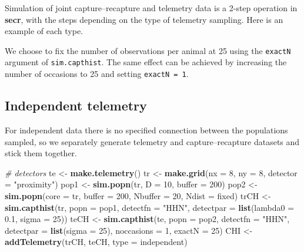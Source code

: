 \documentclass[
]{book}
\newenvironment{Shaded}{\begin{snugshade}}{\end{snugshade}}
\newcommand{\AttributeTok}[1]{\textcolor[rgb]{0.13,0.29,0.53}{#1}}
\newcommand{\CommentTok}[1]{\textcolor[rgb]{0.56,0.35,0.01}{\textit{#1}}}
\newcommand{\DecValTok}[1]{\textcolor[rgb]{0.00,0.00,0.81}{#1}}
\newcommand{\FloatTok}[1]{\textcolor[rgb]{0.00,0.00,0.81}{#1}}
\newcommand{\FunctionTok}[1]{\textcolor[rgb]{0.13,0.29,0.53}{\textbf{#1}}}
\newcommand{\NormalTok}[1]{#1}
\newcommand{\OtherTok}[1]{\textcolor[rgb]{0.56,0.35,0.01}{#1}}
\newcommand{\StringTok}[1]{\textcolor[rgb]{0.31,0.60,0.02}{#1}}
\begin{document}
Simulation of joint capture--recapture and telemetry data is a 2-step operation in \textbf{secr}, with the steps depending on the type of telemetry sampling. Here is an example of each type.

We choose to fix the number of observations per animal at 25 using the \texttt{exactN} argument of \texttt{sim.capthist}. The same effect can be achieved by increasing the number of occasions to 25 and setting \texttt{exactN\ =\ 1}.

\subsection{Independent telemetry}\label{independent-telemetry}

For independent data there is no specified connection between the populations sampled, so we separately generate telemetry and capture--recapture datasets and stick them together.

\begin{Shaded}
\begin{Highlighting}[]
\CommentTok{\# detectors}
\NormalTok{te }\OtherTok{\textless{}{-}} \FunctionTok{make.telemetry}\NormalTok{()}
\NormalTok{tr }\OtherTok{\textless{}{-}} \FunctionTok{make.grid}\NormalTok{(}\AttributeTok{nx =} \DecValTok{8}\NormalTok{, }\AttributeTok{ny =} \DecValTok{8}\NormalTok{, }\AttributeTok{detector =} \StringTok{"proximity"}\NormalTok{)}
\NormalTok{pop1 }\OtherTok{\textless{}{-}} \FunctionTok{sim.popn}\NormalTok{(tr, }\AttributeTok{D =} \DecValTok{10}\NormalTok{, }\AttributeTok{buffer =} \DecValTok{200}\NormalTok{)}
\NormalTok{pop2 }\OtherTok{\textless{}{-}} \FunctionTok{sim.popn}\NormalTok{(}\AttributeTok{core =}\NormalTok{ tr, }\AttributeTok{buffer =} \DecValTok{200}\NormalTok{, }\AttributeTok{Nbuffer =} \DecValTok{20}\NormalTok{, }
                 \AttributeTok{Ndist =} \StringTok{\textquotesingle{}fixed\textquotesingle{}}\NormalTok{)}
\NormalTok{trCH }\OtherTok{\textless{}{-}} \FunctionTok{sim.capthist}\NormalTok{(tr,  }\AttributeTok{popn =}\NormalTok{ pop1, }\AttributeTok{detectfn =} \StringTok{"HHN"}\NormalTok{, }
    \AttributeTok{detectpar =} \FunctionTok{list}\NormalTok{(}\AttributeTok{lambda0 =} \FloatTok{0.1}\NormalTok{, }\AttributeTok{sigma =} \DecValTok{25}\NormalTok{))}
\NormalTok{teCH }\OtherTok{\textless{}{-}} \FunctionTok{sim.capthist}\NormalTok{(te,  }\AttributeTok{popn =}\NormalTok{ pop2, }\AttributeTok{detectfn =} \StringTok{"HHN"}\NormalTok{, }
    \AttributeTok{detectpar =} \FunctionTok{list}\NormalTok{(}\AttributeTok{sigma =} \DecValTok{25}\NormalTok{), }\AttributeTok{noccasions =} \DecValTok{1}\NormalTok{, }\AttributeTok{exactN =} \DecValTok{25}\NormalTok{)}
\NormalTok{CHI }\OtherTok{\textless{}{-}} \FunctionTok{addTelemetry}\NormalTok{(trCH, teCH, }\AttributeTok{type =} \StringTok{\textquotesingle{}independent\textquotesingle{}}\NormalTok{)}
\end{Highlighting}
\end{Shaded}
\end{document}
